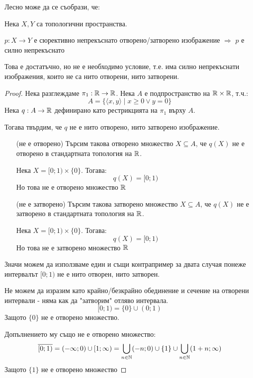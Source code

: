 Лесно може да се съобрази, че:
\begin{proposition}
    Нека $X, Y$ са топологични пространства.

    $p: X \to Y$ е сюрективно непрекъснато отворено/затворено изображение $\Rightarrow$ $p$ е силно непрекъснато
\end{proposition}
\begin{remark}
    Това е достатъчно, но не е необходимо условие, т.е. има силно непрекъснати изображения, които не са нито отворени, нито затворени.
\end{remark}
\begin{proof}
    Нека разглеждаме $\pi_1: {\mathbb{R}} \to {\mathbb{R}}$. Нека $A$ е подпространство на ${\mathbb{R}} \times {\mathbb{R}}$, т.ч.:
    \begin{equation}
        A = \{\langle x, y \rangle \mid x \geq 0 \lor y=0\}
    \end{equation}
    Нека $q : A \to {\mathbb{R}}$ дефинирано като рестрикцията на $\pi_1$ върху $A$.

    Тогава твърдим, че $q$ не е нито отворено, нито затворено изображение.

    \begin{itemize}
        \item[(не е отворено)] Търсим такова отворено множество $X \subseteq A$, че $q(X)$ не е отворено в стандартната топология на ${\mathbb{R}}$.
        
        Нека $X = [0; 1) \times \{0\}$. Тогава:
        \begin{equation}
            q(X) = [0; 1)
        \end{equation}
        Но това не е отворено множество ${\mathbb{R}}$

        \item[(не е затворено)] Търсим такова затворено множество $X \subseteq A$, че $q(X)$ не е затворено в стандартната топология на ${\mathbb{R}}$.
        
        Нека $X = [0; 1) \times \{0\}$. Тогава:
        \begin{equation}
            q(X) = [0; 1)
        \end{equation}
        Но това не е затворено множество ${\mathbb{R}}$
    \end{itemize}
    Значи можем да използваме един и същи контрапример за двата случая понеже интервалът $[0; 1)$ не е нито отворен, нито затворен.

    Не можем да изразим като крайно/безкрайно обединение и сечение на отворени интервали - няма как да "затворим" отляво интервала.
    \begin{equation}
        [0; 1) = \{0\} \cup (0; 1)
    \end{equation}
    Защото $\{0\}$ не е отворено множество.

    Допълнението му също не е отворено множество:
    \begin{equation}
        \overline{[0; 1)} = (-\infty; 0) \cup [1; \infty) = \bigcup_{n \in {\mathbb{N}}} (-n;0) \cup \{1\} \cup \bigcup_{n\in{\mathbb{N}}} (1+n;\infty)
    \end{equation}
    Защото $\{1\}$ не е отворено множество
\end{proof}

